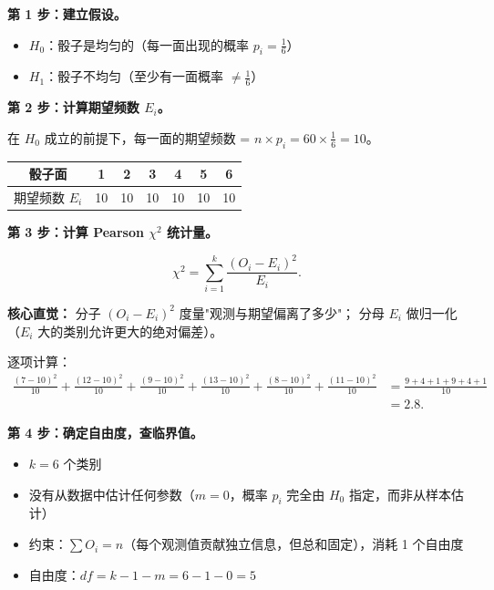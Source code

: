 \textbf{第 1 步：建立假设。}

\begin{itemize}
    \item $H_0$：骰子是均匀的（每一面出现的概率 $p_i = \frac{1}{6}$）
    \item $H_1$：骰子不均匀（至少有一面概率 $\neq \frac{1}{6}$）
\end{itemize}

\textbf{第 2 步：计算期望频数 $E_i$。}

在 $H_0$ 成立的前提下，每一面的期望频数 = $n \times p_i = 60 \times \frac{1}{6} = 10$。

\begin{center}
\begin{tabular}{c|cccccc}
\toprule
骰子面 & 1 & 2 & 3 & 4 & 5 & 6 \\
\midrule
期望频数 $E_i$ & 10 & 10 & 10 & 10 & 10 & 10 \\
\bottomrule
\end{tabular}
\end{center}

\textbf{第 3 步：计算 Pearson $\chi^2$ 统计量。}

\begin{equation}
    \chi^2 = \sum_{i=1}^{k} \frac{(O_i - E_i)^2}{E_i}.
\end{equation}

\textbf{核心直觉：} 分子 $(O_i - E_i)^2$ 度量"观测与期望偏离了多少"；
分母 $E_i$ 做归一化（$E_i$ 大的类别允许更大的绝对偏差）。

逐项计算：
\begin{align}
    \frac{(7-10)^2}{10} + \frac{(12-10)^2}{10} + \frac{(9-10)^2}{10}
    + \frac{(13-10)^2}{10} + \frac{(8-10)^2}{10} + \frac{(11-10)^2}{10}
    &= \frac{9+4+1+9+4+1}{10} \\
    &= 2.8.
\end{align}

\textbf{第 4 步：确定自由度，查临界值。}

\begin{itemize}
    \item $k = 6$ 个类别
    \item 没有从数据中估计任何参数（$m = 0$，概率 $p_i$ 完全由 $H_0$ 指定，而非从样本估计）
    \item 约束：$\sum O_i = n$（每个观测值贡献独立信息，但总和固定），消耗 1 个自由度
    \item 自由度：$df = k - 1 - m = 6 - 1 - 0 = 5$
\end{itemize}

